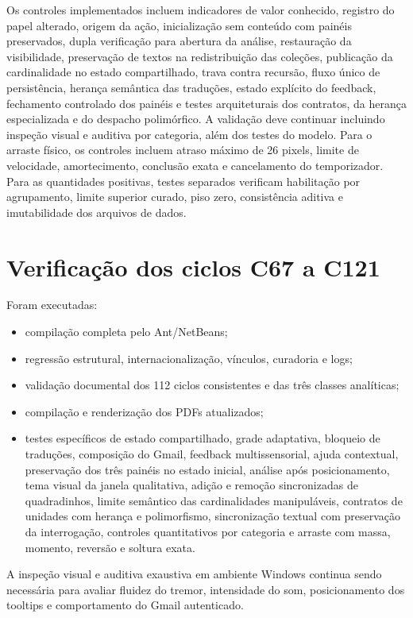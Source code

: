 \documentclass[12pt,a4paper]{article}
\begin{document}
Os controles implementados incluem indicadores de valor conhecido, registro do papel alterado, origem da ação, inicialização sem conteúdo com painéis preservados, dupla verificação para abertura da análise, restauração da visibilidade, preservação de textos na redistribuição das coleções, publicação da cardinalidade no estado compartilhado, trava contra recursão, fluxo único de persistência, herança semântica das traduções, estado explícito do feedback, fechamento controlado dos painéis e testes arquiteturais dos contratos, da herança especializada e do despacho polimórfico. A validação deve continuar incluindo inspeção visual e auditiva por categoria, além dos testes do modelo. Para o arraste físico, os controles incluem atraso máximo de 26 pixels, limite de velocidade, amortecimento, conclusão exata e cancelamento do temporizador. Para as quantidades positivas, testes separados verificam habilitação por agrupamento, limite superior curado, piso zero, consistência aditiva e imutabilidade dos arquivos de dados.

\section{Verificação dos ciclos C67 a C121}

Foram executadas:
\begin{itemize}[noitemsep]
  \item compilação completa pelo Ant/NetBeans;
  \item regressão estrutural, internacionalização, vínculos, curadoria e logs;
  \item validação documental dos 112 ciclos consistentes e das três classes analíticas;
  \item compilação e renderização dos PDFs atualizados;
  \item testes específicos de estado compartilhado, grade adaptativa, bloqueio de traduções, composição do Gmail, feedback multissensorial, ajuda contextual, preservação dos três painéis no estado inicial, análise após posicionamento, tema visual da janela qualitativa, adição e remoção sincronizadas de quadradinhos, limite semântico das cardinalidades manipuláveis, contratos de unidades com herança e polimorfismo, sincronização textual com preservação da interrogação, controles quantitativos por categoria e arraste com massa, momento, reversão e soltura exata.
\end{itemize}

A inspeção visual e auditiva exaustiva em ambiente Windows continua sendo necessária para avaliar fluidez do tremor, intensidade do som, posicionamento dos tooltips e comportamento do Gmail autenticado.
\end{document}
